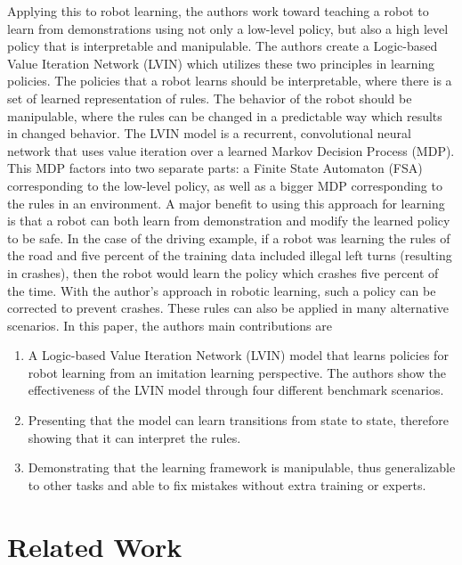 \documentclass[letterpaper, 10 pt, conference]{ieeeconf}  %
\begin{document}
\newline
\indent Applying this to robot learning, the authors work toward teaching a robot to learn from demonstrations using not only a low-level policy, but also a high level policy that is interpretable and manipulable. The authors create a Logic-based Value Iteration Network (LVIN) which utilizes these two principles in learning policies. The policies that a robot learns should be interpretable, where there is a set of learned representation of rules. The behavior of the robot should be manipulable, where the rules can be changed in a predictable way which results in changed behavior. The LVIN model is a recurrent, convolutional neural network that uses value iteration over a learned Markov Decision Process (MDP). This MDP factors into two separate parts: a Finite State Automaton (FSA) corresponding to the low-level policy, as well as a bigger MDP corresponding to the rules in an environment.
\newline
\indent A major benefit to using this approach for learning is that a robot can both learn from demonstration and modify the learned policy to be safe. In the case of the driving example, if a robot was learning the rules of the road and five percent of the training data included illegal left turns (resulting in crashes), then the robot would learn the policy which crashes five percent of the time. With the author's approach in robotic learning, such a policy can be corrected to prevent crashes. These rules can also be applied in many alternative scenarios.
\newline
\indent In this paper, the authors main contributions are
\begin{enumerate}
  \item A Logic-based Value Iteration Network (LVIN) model that learns policies for robot learning from an imitation learning perspective. The authors show the effectiveness of the LVIN model through four different benchmark scenarios.
  \item Presenting that the model can learn transitions from state to state, therefore showing that it can interpret the rules.
  \item Demonstrating that the learning framework is manipulable, thus generalizable to other tasks and able to fix mistakes without extra training or experts.
\end{enumerate}

\section{Related Work}
\end{document}
